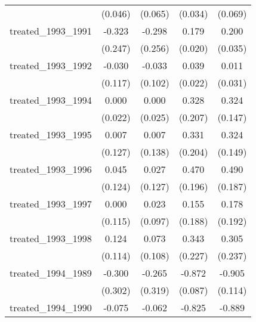 {\begin{tabular}{l*{4}{c}}
            &     (0.046)         &     (0.065)         &     (0.034)         &     (0.069)         \\
[1em]
treated\_1993\_1991&      -0.323         &      -0.298         &       0.179\sym{***}&       0.200\sym{***}\\
            &     (0.247)         &     (0.256)         &     (0.020)         &     (0.035)         \\
[1em]
treated\_1993\_1992&      -0.030         &      -0.033         &       0.039         &       0.011         \\
            &     (0.117)         &     (0.102)         &     (0.022)         &     (0.031)         \\
[1em]
treated\_1993\_1994&       0.000         &       0.000         &       0.328         &       0.324\sym{*}  \\
            &     (0.022)         &     (0.025)         &     (0.207)         &     (0.147)         \\
[1em]
treated\_1993\_1995&       0.007         &       0.007         &       0.331         &       0.324\sym{*}  \\
            &     (0.127)         &     (0.138)         &     (0.204)         &     (0.149)         \\
[1em]
treated\_1993\_1996&       0.045         &       0.027         &       0.470\sym{*}  &       0.490\sym{**} \\
            &     (0.124)         &     (0.127)         &     (0.196)         &     (0.187)         \\
[1em]
treated\_1993\_1997&       0.000         &       0.023         &       0.155         &       0.178         \\
            &     (0.115)         &     (0.097)         &     (0.188)         &     (0.192)         \\
[1em]
treated\_1993\_1998&       0.124         &       0.073         &       0.343         &       0.305         \\
            &     (0.114)         &     (0.108)         &     (0.227)         &     (0.237)         \\
[1em]
treated\_1994\_1989&      -0.300         &      -0.265         &      -0.872\sym{***}&      -0.905\sym{***}\\
            &     (0.302)         &     (0.319)         &     (0.087)         &     (0.114)         \\
[1em]
treated\_1994\_1990&      -0.075         &      -0.062         &      -0.825\sym{***}&      -0.889\sym{***}\\

\end{tabular}}
